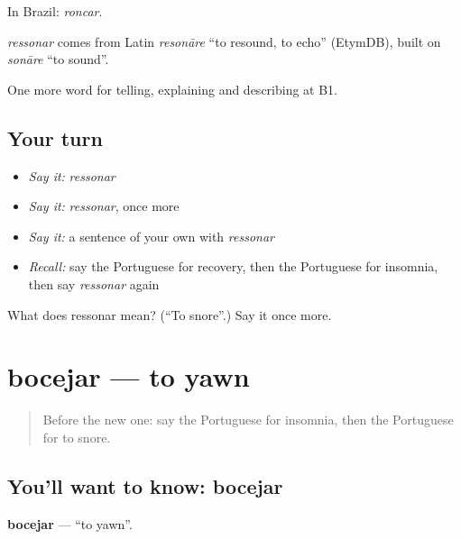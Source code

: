 In Brazil: \emph{roncar}.

\begin{cousinweb}
\emph{ressonar} comes from Latin \emph{resonāre} \textquotedblleft{}to resound, to echo\textquotedblright{} (EtymDB), built on \emph{sonāre} \textquotedblleft{}to sound\textquotedblright{}.
\end{cousinweb}

\begin{grammarlens}[title={What you've built}]
One more word for telling, explaining and describing at B1.
\end{grammarlens}

\subsection*{Your turn}
\begin{itemize}
\raggedright
  \item \emph{Say it:} \emph{ressonar}
  \item \emph{Say it:} \emph{ressonar}, once more
  \item \emph{Say it:} a sentence of your own with \emph{ressonar}
  \item \emph{Recall:} say the Portuguese for recovery, then the Portuguese for insomnia, then say \emph{ressonar} again
\end{itemize}

\begin{tcolorbox}[breakable,colback=teal!4,colframe=teal!35!black,title={Before you move on}]
What does ressonar mean? (\textquotedblleft{}To snore\textquotedblright{}.) Say it once more.
\end{tcolorbox}
\section[bocejar]{bocejar — to yawn}

\label{lesson:PT-C489-bocejar}



\begin{quote}
Before the new one: say the Portuguese for insomnia, then the Portuguese for to snore.
\end{quote}

\subsection*{You'll want to know: bocejar}
\textbf{bocejar} — \textquotedblleft{}to yawn\textquotedblright{}.

